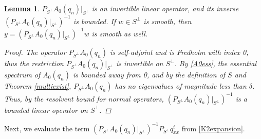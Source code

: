 \documentclass[12pt]{article}
\newtheorem{lemma}{Lemma}
\begin{document}
\begin{lemma}\label{PA0inv}
$P_{S^\perp} A_0(q_n) |_{S^\perp}$ is an invertible linear operator, and its inverse $(P_{S^\perp} A_0(q_n) |_{S^\perp})^{-1}$ is bounded. If $w \in S^\perp$ is smooth, then $y = (P_{S^\perp} A_0(q_n)|_{S^\perp})^{-1} w$ is smooth as well.

\begin{proof}
The operator $P_{S^\perp} A_0(q_n)$ is self-adjoint and is Fredholm with index 0, thus the restriction $P_{S^\perp} A_0(q_n)|_{S^\perp}$ is invertible on $S^\perp$. By \eqref{A0ess}, the essential spectrum of $A_0(q_n)$ is bounded away from 0, and by the definition of $S$ and Theorem \ref{multiexist}, $P_{S^\perp} A_0(q_n)$ has no eigenvalues of magnitude less than $\delta$. Thus, by the resolvent bound for normal operators, $(P_{S^\perp} A_0(q_n)|_{S^\perp})^{-1}$ is a bounded linear operator on $S^\perp$. 
\end{proof}
\end{lemma}

Next, we evaluate the term $(P_{S^\perp} A_0(q_n)|_{S^\perp})^{-1} P_{S^\perp} q^i_{xx}$ from \eqref{K2expansion}.

\end{document}

